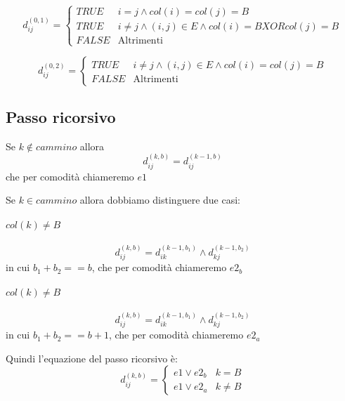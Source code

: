 \documentclass[12pt, a4paper, openany]{book}
\begin{document}
\begin{equation*}
    d_{ij}^{(0,1)} = \begin{cases}
        TRUE  & i=j\land col(i)= col(j) = B                          \\
        TRUE  & i\neq j\land (i,j)\in E \land col(i)= B XOR col(j)=B \\
        FALSE & \text{Altrimenti}
    \end{cases}
\end{equation*}

\begin{equation*}
    d_{ij}^{(0,2)} = \begin{cases}
        TRUE  & i\neq j\land (i,j)\in E \land col(i)= col(j)= B \\
        FALSE & \text{Altrimenti}
    \end{cases}
\end{equation*}

\subsection*{Passo ricorsivo}
Se $k \notin cammino$ allora
\begin{equation*}
    d_{ij}^{(k,b)} = d_{ij}^{(k-1,b)}
\end{equation*}
che per comodità chiameremo $e1$

Se $k \in cammino$ allora dobbiamo distinguere due casi:
\paragraph{$col(k) \neq B$}
\begin{equation*}
    d_{ij}^{(k,b)} = d_{ik}^{(k-1,b_1)} \land d_{kj}^{(k-1,b_2)}
\end{equation*}
in cui $b_1 + b_2 == b$, che per comodità chiameremo $e2_b$
\paragraph{$col(k) \neq B$}
\begin{equation*}
    d_{ij}^{(k,b)} = d_{ik}^{(k-1,b_1)} \land d_{kj}^{(k-1,b_2)}
\end{equation*}
in cui $b_1 + b_2 == b+1$, che per comodità chiameremo $e2_a$

Quindi l'equazione del passo ricorsivo è:
\begin{equation*}
    d^{(k,b)}_{ij} = \begin{cases}
        e1 \lor e2_b & k=B     \\
        e1 \lor e2_a & k\neq B
    \end{cases}
\end{equation*}
\end{document}
